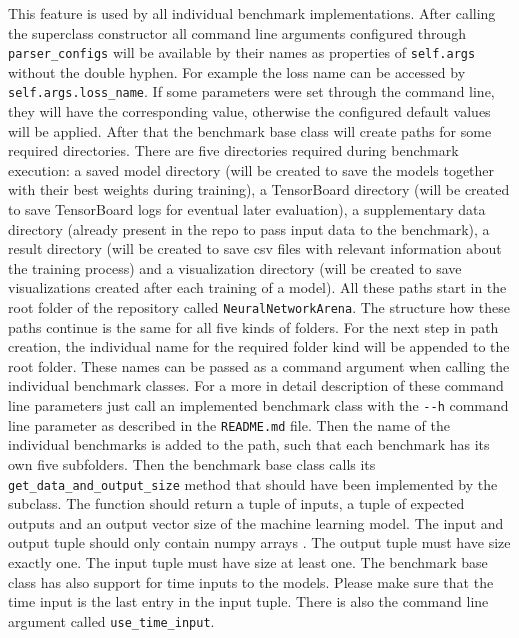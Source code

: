 \documentclass[draft,final]{vutinfth} %
\begin{document}
    This feature is used by all individual benchmark implementations. 
    After calling the superclass constructor all command line arguments configured through \texttt{parser\_configs} will be available by their names as properties of \texttt{self.args} without the double hyphen.
    For example the loss name can be accessed by \texttt{self.args.loss\_name}.
    If some parameters were set through the command line, they will have the corresponding value, otherwise the configured default values will be applied.
    After that the benchmark base class will create paths for some required directories. 
    There are five directories required during benchmark execution: a saved model directory (will be created to save the models together with their best weights during training), a TensorBoard directory (will be created to save TensorBoard logs for eventual later evaluation), a supplementary data directory (already present in the repo to pass input data to the benchmark), a result directory (will be created to save csv files with relevant information about the training process) and a visualization directory (will be created to save visualizations created after each training of a model).
    All these paths start in the root folder of the repository called \texttt{NeuralNetworkArena}. 
    The structure how these paths continue is the same for all five kinds of folders.
    For the next step in path creation, the individual name for the required folder kind will be appended to the root folder.
    These names can be passed as a command argument when calling the individual benchmark classes. 
    For a more in detail description of these command line parameters just call an implemented benchmark class with the \texttt{-{}-h} command line parameter as described in the \texttt{README.md} file.
    Then the name of the individual benchmarks is added to the path, such that each benchmark has its own five subfolders.
    Then the benchmark base class calls its \texttt{get\_data\_and\_output\_size} method that should have been implemented by the subclass.
    The function should return a tuple of inputs, a tuple of expected outputs and an output vector size of the machine learning model.
    The input and output tuple should only contain numpy arrays \cite{numpy}. The output tuple must have size exactly one.
    The input tuple must have size at least one.
    The benchmark base class has also support for time inputs to the models.
    Please make sure that the time input is the last entry in the input tuple.
    There is also the command line argument called \texttt{use\_time\_input}. 
\end{document}
